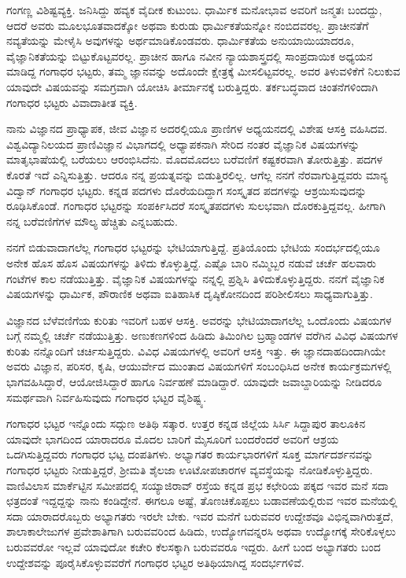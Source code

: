 {ಗಂಗಣ್ಣ ವಿಶಿಷ್ಟವ್ಯಕ್ತಿ.  ಜನಿಸಿದ್ದು ಹವ್ಯಕ ವೈದೀಕ ಕುಟುಂಬ.  ಧಾರ್ಮಿಕ ಮನೋಭಾವ ಅವರಿಗೆ ಜನ್ಮತಃ ಬಂದದ್ದು, ಆದರೆ ಅವರು ಮೂಲಭೂತವಾದಕ್ಕೋ ಅಥವಾ ಕುರುಡು ಧಾರ್ಮಿಕತೆಯನ್ನೋ ನಂಬಿದವರಲ್ಲ.  ಪ್ರಾಚೀನತೆಗೆ ನವ್ಯತೆಯನ್ನು ಮೇಳೈಸಿ ಅವುಗಳನ್ನು ಅರ್ಥಮಾಡಿಕೊಂಡವರು.  ಧಾರ್ಮಿಕತೆಯ ಅನುಯಾಯಿಯಾದರೂ, ವೈಜ್ಞಾನಿಕತೆಯನ್ನು ಬಿಟ್ಟುಕೊಟ್ಟವರಲ್ಲ.  ಪ್ರಾಚೀನ ಹಾಗೂ ನವೀನ ನ್ಯಾಯಶಾಸ್ತ್ರದಲ್ಲಿ ಸಾಂಪ್ರದಾಯಿಕ ಅಧ್ಯಯನ ಮಾಡಿದ್ದ ಗಂಗಾಧರ ಭಟ್ಟರು,  ತಮ್ಮ ಜ್ಞಾನವನ್ನು ಅದೊಂದೇ ಕ್ಷೇತ್ರಕ್ಕೆ ಮೀಸಲಿಟ್ಟವರಲ್ಲ.  ಅವರ ತಿಳುವಳಿಕೆಗೆ ನಿಲುಕುವ ಯಾವುದೇ ವಿಷಯ\-ವನ್ನು ಸಮಗ್ರವಾಗಿ ಯೋಚಿಸಿ ತೀರ್ಮಾನಕ್ಕೆ ಬರುತ್ತಿದ್ದರು.  ತರ್ಕಬದ್ಧವಾದ ಚಿಂತನೆಗಳಿಂದಾಗಿ  ಗಂಗಾಧರ ಭಟ್ಟರು ವಿವಾದಾತೀತ ವ್ಯಕ್ತಿ.    

ನಾನು ವಿಜ್ಞಾನದ ಪ್ರಾಧ್ಯಾಪಕ, ಜೀವ ವಿಜ್ಞಾನ ಅದರಲ್ಲಿಯೂ ಪ್ರಾಣಿಗಳ ಅಧ್ಯಯನದಲ್ಲಿ ವಿಶೇಷ ಆಸಕ್ತಿ ವಹಿಸಿದವ.  ವಿಶ್ವವಿದ್ಯಾನಿಲಯದ ಪ್ರಾಣಿವಿಜ್ಞಾನ ವಿಭಾಗದಲ್ಲಿ ಅಧ್ಯಾಪಕನಾಗಿ ಸೇರಿದ ನಂತರ ವೈಜ್ಞಾನಿಕ ವಿಷಯಗಳನ್ನು ಮಾತೃಭಾಷೆಯಲ್ಲಿ ಬರೆಯಲು ಆರಂಭಿಸಿದೆನು.  ಮೊದಮೊದಲು ಬರೆವಣಿಗೆ ಕಷ್ಟಕರವಾಗಿ ತೋರುತ್ತಿತ್ತು.  ಪದಗಳ ಕೊರತೆ ಇದೆ ಎನ್ನಿಸುತ್ತಿತ್ತು.  ಆದರೂ ನನ್ನ ಪ್ರಯತ್ನವನ್ನು ಬಿಡುತ್ತಿರಲಿಲ್ಲ.  ಆಗೆಲ್ಲ ನನಗೆ ನೆರವಾಗುತ್ತಿದ್ದವರು ಮಾನ್ಯ ವಿದ್ವಾನ್ ಗಂಗಾಧರ ಭಟ್ಟರು. ಕನ್ನಡ ಪದಗಳು ದೊರೆಯದಿದ್ದಾಗ ಸಂಸ್ಕೃತದ ಪದಗಳನ್ನು ಆಶ್ರಯಿಸುವುದನ್ನು ರೂಢಿಸಿಕೊಂಡೆ.  ಗಂಗಾಧರ ಭಟ್ಟರನ್ನು ಸಂಪರ್ಕಿಸಿದರೆ ಸಂಸ್ಕೃತಪದಗಳು ಸುಲಭವಾಗಿ ದೊರಕುತ್ತಿದ್ದವಲ್ಲ.  ಹೀಗಾಗಿ ನನ್ನ ಬರೆವಣಿಗೆಗಳ ಮೌಲ್ಯ ಹೆಚ್ಚಿತು ಎನ್ನಬಹುದು.  

ನನಗೆ ಬಿಡುವಾದಾಗಲೆಲ್ಲ ಗಂಗಾಧರ ಭಟ್ಟರನ್ನು ಭೇಟಿಯಾಗುತ್ತಿದ್ದೆ.  ಪ್ರತಿಯೊಂದು ಭೇಟಿಯ ಸಂದರ್ಭದಲ್ಲಿಯೂ ಅನೇಕ ಹೊಸ ಹೊಸ ವಿಷಯಗಳನ್ನು ತಿಳಿದು ಕೊಳ್ಳುತ್ತಿದ್ದೆ.  ಎಷ್ಟೊ ಬಾರಿ ನಮ್ಮಿಬ್ಬರ ನಡುವೆ ಚರ್ಚೆ ಹಲವಾರು ಗಂಟೆಗಳ ಕಾಲ ನಡೆಯುತ್ತಿತ್ತು.  ವೈಜ್ಞಾನಿಕ ವಿಷಯಗಳನ್ನು ನನ್ನಲ್ಲಿ ಪ್ರಶ್ನಿಸಿ ತಿಳಿದುಕೊಳ್ಳುತ್ತಿದ್ದರು.  ನನಗೆ ವೈಜ್ಞಾನಿಕ ವಿಷಯಗಳನ್ನು ಧಾರ್ಮಿಕ, ಪೌರಾಣಿಕ ಅಥವಾ ಐತಿಹಾಸಿಕ ದೃಷ್ಠಿಕೋನದಿಂದ ಪರಿಶೀಲಿ\-ಸಲು ಸಾಧ್ಯವಾಗುತ್ತಿತ್ತು.   
\vskip 4pt

ವಿಜ್ಞಾನದ ಬೆಳೆವಣಿಗೆಯ ಕುರಿತು ಇವರಿಗೆ ಬಹಳ ಆಸಕ್ತಿ. ಅವರನ್ನು ಭೇಟಿಯಾದಾಗಲೆಲ್ಲ  ಒಂದೊಂದು ವಿಷಯಗಳ ಬಗ್ಗೆ ನಮ್ಮಲ್ಲಿ ಚರ್ಚೆ ನಡೆಯುತ್ತಿತ್ತು.  ಅಣು\enginline{-}ಕಣಗಳಿಂದ ಹಿಡಿದು ತಿಮಿಂಗಿಲ ಬ್ರಹ್ಮಾಂಡಗಳ ವರೆಗಿನ ವಿವಿಧ ವಿಷಯಗಳ ಕುರಿತು ನನ್ನೊಂದಿಗೆ ಚರ್ಚಿಸುತ್ತಿದ್ದರು.  ವಿವಿಧ ವಿಷಯಗಳಲ್ಲಿ ಅವರಿಗೆ ಆಸಕ್ತಿ ಇತ್ತು.  ಈ ಜ್ಞಾನದಾಹದಿಂದಾಗಿಯೇ ಅವರು ವಿಜ್ಞಾನ, ಪರಿಸರ, ಕೃಷಿ, ಆಯುರ್ವೇದ ಮುಂತಾದ ವಿಷಯ\-ಗಳಿಗೆ ಸಂಬಂಧಿಸಿದ ಅನೇಕ ಕಾರ್ಯಕ್ರಮಗಳಲ್ಲಿ ಭಾಗವಹಿಸಿದ್ದಾರೆ, ಆಯೋಜಿ\-ಸಿದ್ದಾರೆ ಹಾಗೂ ನಿರ್ವಹಣೆ ಮಾಡಿದ್ದಾರೆ.  ಯಾವುದೇ ಜವಾಬ್ದಾರಿಯನ್ನು ನೀಡಿದರೂ ಸಮರ್ಥವಾಗಿ ನಿರ್ವಹಿಸುವುದು ಗಂಗಾಧರ ಭಟ್ಟರ ವೈಶಿಷ್ಟ್ಯ. 
\vskip 4pt

ಗಂಗಾಧರ ಭಟ್ಟರ ಇನ್ನೊಂದು ಸದ್ಗುಣ ಅತಿಥಿ ಸತ್ಕಾರ.  ಉತ್ತರ ಕನ್ನಡ ಜಿಲ್ಲೆಯ ಸಿರ್ಸಿ ಸಿದ್ದಾಪುರ ತಾಲೂಕಿನ ಯಾವುದೇ ಭಾಗದಿಂದ ಯಾರಾದರೂ ಮೊದಲ ಬಾರಿಗೆ ಮೈಸೂರಿಗೆ ಬಂದರೆಂದರೆ ಅವರಿಗೆ ಆಶ್ರಯ ಒದಗಿಸುತ್ತಿದ್ದವರು ಗಂಗಾಧರ ಭಟ್ಟ ದಂಪತಿಗಳು.  ಅಭ್ಯಾಗತರ ಕಾರ್ಯಭಾರಗಳಿಗೆ ಸೂಕ್ತ ಮಾರ್ಗದರ್ಶನವನ್ನು ಗಂಗಾಧರ ಭಟ್ಟರು ನೀಡುತ್ತಿದ್ದರೆ, ಶ್ರೀಮತಿ ಶೈಲಜಾ ಊಟೋಪಚಾರಗಳ ವ್ಯವಸ್ಥೆಯನ್ನು ನೋಡಿಕೊಳ್ಳುತ್ತಿದ್ದರು.  ವಾಣಿವಿಲಾಸ ಮಾರ್ಕೆಟ್ಟಿನ ಸಮೀಪದಲ್ಲಿ ಸಯ್ಯಾಜಿರಾವ್ ರಸ್ತೆಯ ಕನ್ನಡ ಪ್ರಭ ಕಛೇರಿಯ ಪಕ್ಕದ ಇವರ ಮನೆ ಸದಾ ಛತ್ರದಂತೆ ಇದ್ದದ್ದನ್ನು ನಾನು ಕಂಡಿದ್ದೇನೆ.  ಈಗಲೂ ಅಷ್ಟೆ, ತೊಣಚಿಕೊಪ್ಪಲು ಬಡಾವಣೆಯಲ್ಲಿರುವ ಇವರ ಮನೆಯಲ್ಲಿ ಸದಾ ಯಾರಾದರೊಬ್ಬರು ಅಭ್ಯಾಗತರು ಇರಲೇ ಬೇಕು.  ಇವರ ಮನೆಗೆ ಬರುವವರ ಉದ್ದೇಶವೂ ವಿಭಿನ್ನವಾಗಿರುತ್ತದೆ, ಶಾಲಾ\enginline{-}ಕಾಲೇಜುಗಳ ಪ್ರವೇಶಾತಿಗಾಗಿ ಬರುವವರಿಂದ ಹಿಡಿದು, ಉದ್ಯೋಗವನ್ನರಸಿ ಅಥವಾ ಉದ್ಯೋಗಕ್ಕೆ ಸೇರಿಕೊಳ್ಳಲು ಬರುವವರೋ ಇಲ್ಲವೆ ಯಾವುದೋ ಕಚೇರಿ ಕೆಲಸಕ್ಕಾಗಿ ಬರುವವರೂ ಇದ್ದರು.  ಹೀಗೆ ಬಂದ ಅಭ್ಯಾಗತರು ಬಂದ ಉದ್ದೇಶವನ್ನು ಪೂರೈಸಿಕೊಳ್ಳುವವರೆಗೆ ಗಂಗಾಧರ ಭಟ್ಟರ ಅತಿಥಿಯಾಗಿದ್ದ ಸಂದರ್ಭಗಳಿವೆ.         

}
